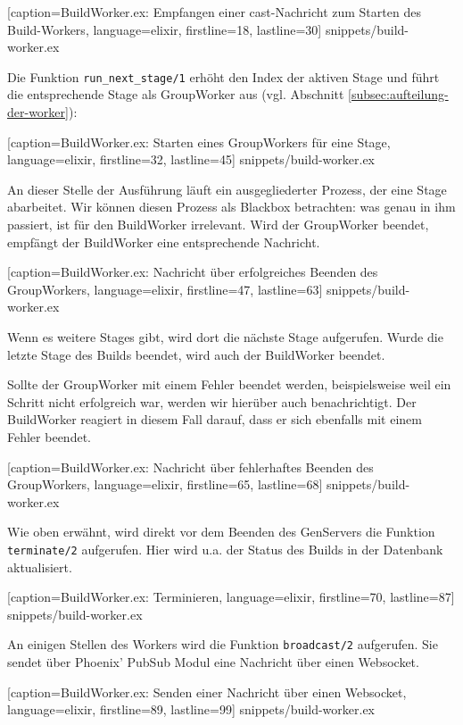 
  [caption={BuildWorker.ex: Empfangen einer cast-Nachricht zum Starten des Build-Workers},
  language=elixir,
  firstline=18,
  lastline=30]
  {snippets/build-worker.ex}

Die Funktion \texttt{run\_\allowbreak next\_\allowbreak stage/1} erhöht den Index der aktiven Stage und führt die entsprechende Stage als GroupWorker aus (vgl. Abschnitt \ref{subsec:aufteilung-der-worker}):


  [caption={BuildWorker.ex: Starten eines GroupWorkers für eine Stage},
  language=elixir,
  firstline=32,
  lastline=45]
  {snippets/build-worker.ex}

An dieser Stelle der Ausführung läuft ein ausgegliederter Prozess, der eine Stage abarbeitet. Wir können diesen Prozess als Blackbox betrachten: was genau in ihm passiert, ist für den BuildWorker irrelevant. Wird der GroupWorker beendet, empfängt der BuildWorker eine entsprechende Nachricht.


  [caption={BuildWorker.ex: Nachricht über erfolgreiches Beenden des GroupWorkers},
  language=elixir,
  firstline=47,
  lastline=63]
  {snippets/build-worker.ex}

Wenn es weitere Stages gibt, wird dort die nächste Stage aufgerufen. Wurde die letzte Stage des Builds beendet, wird auch der BuildWorker beendet.

Sollte der GroupWorker mit einem Fehler beendet werden, beispielsweise weil ein Schritt nicht erfolgreich war, werden wir hierüber auch benachrichtigt. Der BuildWorker reagiert in diesem Fall darauf, dass er sich ebenfalls mit einem Fehler beendet.


  [caption={BuildWorker.ex: Nachricht über fehlerhaftes Beenden des GroupWorkers},
  language=elixir,
  firstline=65,
  lastline=68]
  {snippets/build-worker.ex}

Wie oben erwähnt, wird direkt vor dem Beenden des GenServers die Funktion \texttt{terminate/2} aufgerufen. Hier wird u.a. der Status des Builds in der Datenbank aktualisiert.


  [caption={BuildWorker.ex: Terminieren},
  language=elixir,
  firstline=70,
  lastline=87]
  {snippets/build-worker.ex}

An einigen Stellen des Workers wird die Funktion \texttt{broadcast/2} aufgerufen. Sie sendet über Phoenix' PubSub Modul eine Nachricht über einen Websocket.


  [caption={BuildWorker.ex: Senden einer Nachricht über einen Websocket},
  language=elixir,
  firstline=89,
  lastline=99]
  {snippets/build-worker.ex}

